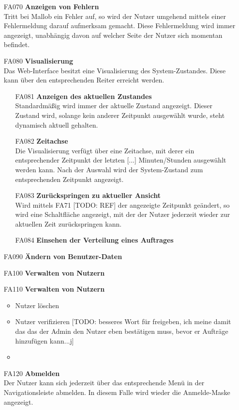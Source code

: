 \begin{itemize}
   \item[FA070] \textbf{Anzeigen von Fehlern} \\
        Tritt bei Mallob ein Fehler auf, so wird der Nutzer umgehend mittels einer Fehlermeldung darauf aufmerksam gemacht. Diese Fehlermeldung wird immer angezeigt, unabhängig davon auf welcher Seite der Nutzer sich momentan befindet. 
    \item[FA080] \textbf{Visualisierung} \\
        Das Web-Interface besitzt eine Visualisierung des System-Zustandes. Diese kann über den entsprechenden Reiter erreicht werden.
        
        \begin{itemize}
            \item[FA081] \textbf{Anzeigen des aktuellen Zustandes} \\
                Standardmäßig wird immer der aktuelle Zustand angezeigt. Dieser Zustand wird, solange kein anderer Zeitpunkt ausgewählt wurde, steht dynamisch aktuell gehalten. 
            \item[FA082] \textbf{Zeitachse} \\
                Die Visualisierung verfügt über eine Zeitachse, mit derer ein entsprechender Zeitpunkt der letzten [...] Minuten/Stunden ausgewählt werden kann. Nach der Auswahl wird der System-Zustand zum entsprechenden Zeitpunkt angezeigt.
            \item[FA083] \textbf{Zurückspringen zu aktueller Ansicht} \\
                Wird mittels FA71 [TODO: REF] der angezeigte Zeitpunkt geändert, so wird eine Schaltfläche angezeigt, mit der der Nutzer jederzeit wieder zur aktuellen Zeit zurückspringen kann.
            \item[FA084] \textbf{Einsehen der Verteilung eines Auftrages} \\
                 
        \end{itemize}
    \item[FA090] \textbf{Ändern von Benutzer-Daten} \\
    
    \item[FA100] \textbf{Verwalten von Nutzern}
    \item[FA110] \textbf{Verwalten von Nutzern}
        \begin{itemize}
            \item Nutzer löschen
            \item Nutzer verifizieren [TODO: besseres Wort für freigeben, ich meine damit das das der Admin den Nutzer eben bestätigen muss, bevor er Aufträge hinzufügen kann...j]
            \item 
        \end{itemize} 
    \item[FA120] \textbf{Abmelden} \\
        Der Nutzer kann sich jederzeit über das entsprechende Menü in der Navigationsleiste abmelden. In diesem Falle wird wieder die Anmelde-Maske angezeigt.
\end{itemize}




